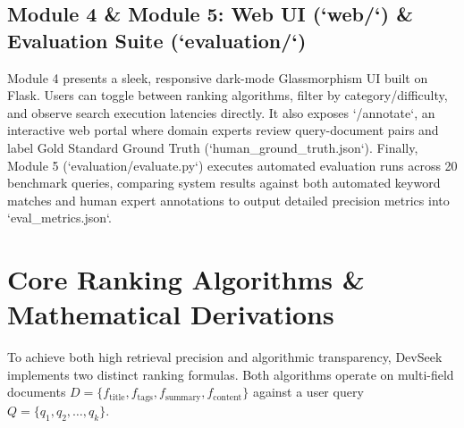\documentclass[12pt,a4paper]{article}
\begin{document}
\subsection{Module 4 \& Module 5: Web UI (`web/`) \& Evaluation Suite (`evaluation/`)}
Module 4 presents a sleek, responsive dark-mode Glassmorphism UI built on Flask. Users can toggle between ranking algorithms, filter by category/difficulty, and observe search execution latencies directly. It also exposes `/annotate`, an interactive web portal where domain experts review query-document pairs and label Gold Standard Ground Truth (`human\_ground\_truth.json`). Finally, Module 5 (`evaluation/evaluate.py`) executes automated evaluation runs across 20 benchmark queries, comparing system results against both automated keyword matches and human expert annotations to output detailed precision metrics into `eval\_metrics.json`.

\section{Core Ranking Algorithms \& Mathematical Derivations}

To achieve both high retrieval precision and algorithmic transparency, DevSeek implements two distinct ranking formulas. Both algorithms operate on multi-field documents $D = \{f_{\text{title}}, f_{\text{tags}}, f_{\text{summary}}, f_{\text{content}}\}$ against a user query $Q = \{q_1, q_2, \dots, q_k\}$.
\end{document}
